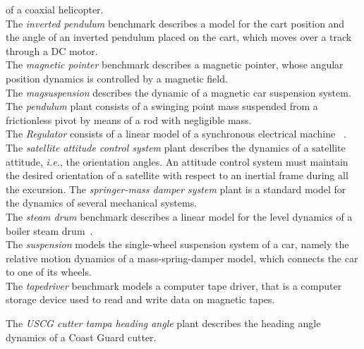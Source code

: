 of a coaxial helicopter. \\ 
%
The \textit{inverted pendulum} benchmark  
describes a model for the cart position and the angle of an inverted pendulum placed on the cart,  
which moves over a track through a DC motor. \\ 
%
The \textit{magnetic pointer} benchmark  describes a magnetic pointer, 
whose angular position dynamics is controlled by a magnetic field. \\ 
%
The \textit{magsuspension} describes  the dynamic of a magnetic car suspension system. \\
The \textit{pendulum}  plant consists of a swinging point mass suspended from a frictionless pivot by means of a rod with negligible mass.  \\ 
%
The \textit{Regulator} consists of a linear model of a synchronous electrical machine%
~\cite{KOKOTOVIC198023}. \\
The \textit{satellite attitude control system} plant describes the dynamics of a satellite 
attitude, {\it i.e.}, the orientation angles. An attitude control system must maintain the desired 
orientation of a satellite with respect to an 
inertial frame during all the excursion. 
The \textit{springer-mass damper system} plant is a standard model for the dynamics of several mechanical systems. \\ 
The \textit{steam drum} benchmark describes a linear model for the level dynamics of a boiler steam drum~\cite{boiler}. \\ 
%
The \textit{suspension} models the single-wheel suspension system of a car, 
namely the relative motion dynamics of a mass-spring-damper model, which connects the car to one of its wheels.  \\
The \textit{tapedriver} benchmark models a computer tape driver, 
that is a computer storage device used to read and write data on magnetic tapes. 

The \textit{USCG cutter tampa heading angle} plant describes the heading angle dynamics of a Coast 
Guard cutter. 

 
